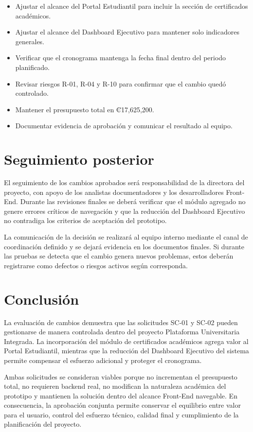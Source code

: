\documentclass[11pt,spanish]{article}
\begin{document}
\begin{itemize}[leftmargin=*, label={\textbullet}]
    \item Ajustar el alcance del Portal Estudiantil para incluir la sección de certificados académicos.
    \item Ajustar el alcance del Dashboard Ejecutivo para mantener solo indicadores generales.
    \item Verificar que el cronograma mantenga la fecha final dentro del periodo planificado.
    \item Revisar riesgos R-01, R-04 y R-10 para confirmar que el cambio quedó controlado.
    \item Mantener el presupuesto total en ₡17,625,200.
    \item Documentar evidencia de aprobación y comunicar el resultado al equipo.
\end{itemize}

\section{Seguimiento posterior}

El seguimiento de los cambios aprobados será responsabilidad de la directora del proyecto, con apoyo de los analistas documentadores y los desarrolladores Front-End. Durante las revisiones finales se deberá verificar que el módulo agregado no genere errores críticos de navegación y que la reducción del Dashboard Ejecutivo no contradiga los criterios de aceptación del prototipo.

La comunicación de la decisión se realizará al equipo interno mediante el canal de coordinación definido y se dejará evidencia en los documentos finales. Si durante las pruebas se detecta que el cambio genera nuevos problemas, estos deberán registrarse como defectos o riesgos activos según corresponda.

\section{Conclusión}

La evaluación de cambios demuestra que las solicitudes SC-01 y SC-02 pueden gestionarse de manera controlada dentro del proyecto Plataforma Universitaria Integrada. La incorporación del módulo de certificados académicos agrega valor al Portal Estudiantil, mientras que la reducción del Dashboard Ejecutivo del sistema permite compensar el esfuerzo adicional y proteger el cronograma.

Ambas solicitudes se consideran viables porque no incrementan el presupuesto total, no requieren backend real, no modifican la naturaleza académica del prototipo y mantienen la solución dentro del alcance Front-End navegable. En consecuencia, la aprobación conjunta permite conservar el equilibrio entre valor para el usuario, control del esfuerzo técnico, calidad final y cumplimiento de la planificación del proyecto.
\end{document}
